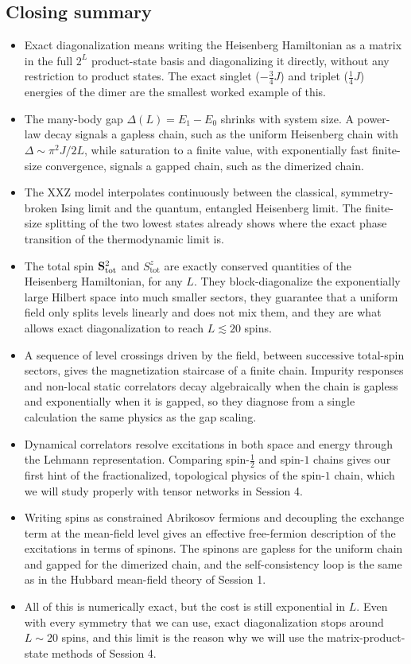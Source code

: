 \documentclass[lecture_notes.tex]{subfiles}
\begin{document}
\subsection*{Closing summary}
\begin{itemize}[nosep]
  \item Exact diagonalization means writing the Heisenberg Hamiltonian as a matrix in the full $2^L$
    product-state basis and diagonalizing it directly, without any restriction to product states.
    The exact singlet ($-\tfrac34J$) and triplet ($\tfrac14J$) energies of the dimer are the smallest
    worked example of this.
  \item The many-body gap $\Delta(L)=E_1-E_0$ shrinks with system size. A power-law decay signals a
    gapless chain, such as the uniform Heisenberg chain with $\Delta\sim\pi^2J/2L$, while saturation
    to a finite value, with exponentially fast finite-size convergence, signals a gapped chain, such
    as the dimerized chain.
  \item The XXZ model interpolates continuously between the classical, symmetry-broken Ising limit
    and the quantum, entangled Heisenberg limit. The finite-size splitting of the two lowest states
    already shows where the exact phase transition of the thermodynamic limit is.
  \item The total spin $\vb S_{\mathrm{tot}}^2$ and $S_{\mathrm{tot}}^z$ are exactly conserved
    quantities of the Heisenberg Hamiltonian, for any $L$. They block-diagonalize the exponentially
    large Hilbert space into much smaller sectors, they guarantee that a uniform field only splits
    levels linearly and does not mix them, and they are what allows exact diagonalization to reach
    $L\lesssim20$ spins.
  \item A sequence of level crossings driven by the field, between successive total-spin sectors,
    gives the magnetization staircase of a finite chain. Impurity responses and non-local static
    correlators decay algebraically when the chain is gapless and exponentially when it is gapped,
    so they diagnose from a single calculation the same physics as the gap scaling.
  \item Dynamical correlators resolve excitations in both space and energy through the Lehmann
    representation. Comparing spin-$\tfrac12$ and spin-$1$ chains gives our first hint of the
    fractionalized, topological physics of the spin-$1$ chain, which we will study properly with
    tensor networks in Session 4.
  \item Writing spins as constrained Abrikosov fermions and decoupling the exchange term at the
    mean-field level gives an effective free-fermion description of the excitations in terms of
    spinons. The spinons are gapless for the uniform chain and gapped for the dimerized chain, and
    the self-consistency loop is the same as in the Hubbard mean-field theory of Session 1.
  \item All of this is numerically exact, but the cost is still exponential in $L$. Even with every
    symmetry that we can use, exact diagonalization stops around $L\sim20$ spins, and this limit is
    the reason why we will use the matrix-product-state methods of Session 4.
\end{itemize}
\end{document}
